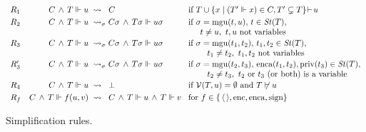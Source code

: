 \documentclass[acmtocl,acmnow]{acmtrans2m}
\newcommand{\comment}[1]{}
\newcommand{\var}{\mathcal{V}}
\newcommand{\mgu}{\operatorname{mgu}}
\newcommand{\set}[1]{\lbrace{#1}\rbrace}
\newcommand{\pair}[2]{\langle{#1},{#2}\rangle}
\newcommand{\st}{\mathit{St}}
\newcommand{\penc}[2]{\operatorname{enc}(#1,#2)}
\newcommand{\enc}{\operatorname{enc}}
\newcommand{\enca}{\operatorname{enca}}
\newcommand{\sign}{\operatorname{sign}}
\newcommand{\priv}{\operatorname{priv}}
\newcommand{\simpl}{\rightsquigarrow}   \newcommand{\msimpl}{\rightsquigarrow}  \newcommand{\gsimpl}{\leadsto}
\begin{document}
\begin{figure}[t]
\[\begin{array}{l@{\quad}r@{\hspace{0.2cm}}l@{\hspace{0.3cm}}l}
R_1 & C\,\wedge\,T\Vdash u &
\simpl\hspace{0.2cm}C& \mbox{if } T\cup\set{x\mid (T'\Vdash x)\in C, T'\subsetneq T}\!\vdash\!u\\[0.1cm]
R_2 & C\,\wedge\,T\Vdash u & \simpl_\sigma
C\sigma\,\wedge\,T\sigma\Vdash u\sigma &
\mbox{if } \sigma=\mgu(t,u),\, t\in \st(T),\\
\vspace{-0.5mm}&&&\hspace{0.5cm} t\neq u,\ t, u \mbox{ not
variables}
\\[0.1cm]
R_3 & C\,\wedge\,T\Vdash u & \simpl_\sigma
C\sigma\,\wedge\,T\sigma\Vdash u\sigma &
 \mbox{if } \sigma=\mgu(t_1,t_2),\, t_1,t_2\in \st(T),\\
\vspace{-0.5mm}&&& \hspace{0.8cm}t_1\neq t_2,\ t_1,t_2 \mbox{ not variables}\\[0.1cm]
R'_3 & C\,\wedge\,T\Vdash u & \simpl_\sigma
C\sigma\,\wedge\,T\sigma\Vdash u\sigma &
 \mbox{if } \sigma=\mgu(t_2,t_3),\, \enca(t_1,t_2),\priv(t_3)\in \st(T),\\
\vspace{-0.5mm}&&& \hspace{0.8cm}t_2\neq t_3,\ t_2\mbox{ or }t_3 \mbox{ (or both) is a variable}\\[0.1cm]
R_4 & C\,\wedge\,T\Vdash u & \simpl\hspace{0.2cm}\bot &
\mbox{if } \var(T,u)=\emptyset \mbox{ and }
T\not\vdash u\\[0.1cm]
R_f & C\,\wedge\,T\Vdash f(u,v) &
\simpl\hspace{0.2cm}C\,\wedge\,T\Vdash u\,\wedge\,T\Vdash
v & \mbox{for } f\in\{\,\langle\,\rangle,\enc,\enca,\sign\}\\

\comment{ R_{\pair{}{}} & C\,\wedge\,T\Vdash \pair{u}{v} &
\simpl\hspace{0.2cm}C\,\wedge\,T\Vdash u\,\wedge\,T\Vdash
v
\\
R_{\enc} & C\,\wedge\,T\Vdash \penc{u}{v} & \simpl\hspace{0.2cm}C\,\wedge\,T\Vdash
u\,\wedge\,T\Vdash v
\\
R_{\enca} & C\,\wedge\,T\Vdash \enca(u,v) & \simpl\hspace{0.2cm}C\,\wedge\,T\Vdash
u\,\wedge\,T\Vdash v
\\
R_{\sign} & C\,\wedge\,T\Vdash \sign(u,v) & \simpl\hspace{0.2cm}C\,\wedge\,T\Vdash
u\,\wedge\,T\Vdash v
\\
}
\end{array}\]
\caption{Simplification rules.}
\label{fig:rules}
\end{figure}
\end{document}
